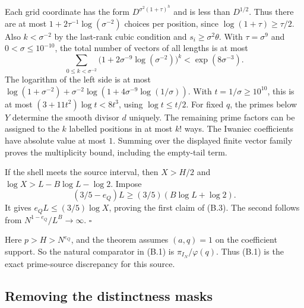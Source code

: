 Each grid coordinate has the form $D^{\sigma^2(1+\tau)^h}$ and is
less than $D^{1/2}$. Thus there are at most
$1+2\tau^{-1}\log(\sigma^{-2})$ choices per position, since
$\log(1+\tau)\ge\tau/2$. Also $k<\sigma^{-2}$ by the
last-rank cubic condition and $s_i\ge\sigma^2\theta$. With
$\tau=\sigma^9$ and $0<\sigma\le10^{-10}$, the total number of
vectors of all lengths is at most
\[
 \sum_{0\le k<\sigma^{-2}}
  \bigl(1+2\sigma^{-9}\log(\sigma^{-2})\bigr)^k
 <\exp(8\sigma^{-3}).
\]
The logarithm of the left side is at most
$\log(1+\sigma^{-2})+
\sigma^{-2}\log(1+4\sigma^{-9}\log(1/\sigma))$.
With $t=1/\sigma\ge10^{10}$, this is at most
$(3+11t^2)\log t<8t^3$, using $\log t\le t/2$.
For fixed $q$, the primes below $Y$
determine the smooth divisor $d$ uniquely. The remaining prime factors
can be assigned to the $k$ labelled positions in at most $k!$ ways.
The Iwaniec coefficients have absolute value at most $1$.
Summing over the displayed finite vector family proves the
multiplicity bound, including the empty-tail term.

If the shell meets the source interval, then $X>H/2$ and
$\log X>L-B\log L-\log2$. Impose
\[
 (3/5-e_Q)L\ge(3/5)(B\log L+\log2).
 \tag{B.4}
\]
It gives $e_QL\le(3/5)\log X$, proving the first claim
of (B.3). The second follows from $N^{1-e_Q}/L^B\to\infty$.
\hfill$\square$

Here $p>H>N^{e_Q}$, and the theorem assumes $(a,q)=1$ on the
coefficient support. So the natural comparator in (B.1) is
$\pi_{I_N}/\varphi(q)$. Thus (B.1) is the exact prime-source
discrepancy for this source.

\subsection*{Removing the distinctness masks}

